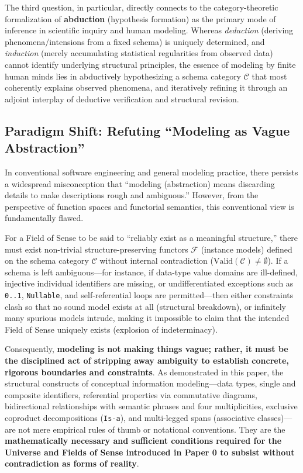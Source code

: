 \documentclass[11pt,a4paper]{article}
\theoremstyle{definition}
\theoremstyle{plain}
\theoremstyle{remark}
\newcommand{\Valid}{\mathrm{Valid}}
\begin{document}
The third question, in particular, directly connects to the category-theoretic formalization of \textbf{abduction} (hypothesis formation) \cite{peirce1903} as the primary mode of inference in scientific inquiry and human modeling. Whereas \emph{deduction} (deriving phenomena/intensions from a fixed schema) is uniquely determined, and \emph{induction} (merely accumulating statistical regularities from observed data) cannot identify underlying structural principles, the essence of modeling by finite human minds lies in abductively hypothesizing a schema category $\mathcal{C}$ that most coherently explains observed phenomena, and iteratively refining it through an adjoint interplay of deductive verification and structural revision.

\subsection{Paradigm Shift: Refuting ``Modeling as Vague Abstraction''}
In conventional software engineering and general modeling practice, there persists a widespread misconception that ``modeling (abstraction) means discarding details to make descriptions rough and ambiguous.'' However, from the perspective of function spaces and functorial semantics, this conventional view is fundamentally flawed.

For a Field of Sense to be said to ``reliably exist as a meaningful structure,'' there must exist non-trivial structure-preserving functors $\mathcal{F}$ (instance models) defined on the schema category $\mathcal{C}$ without internal contradiction ($\Valid(\mathcal{C}) \neq \emptyset$). If a schema is left ambiguous---for instance, if data-type value domains are ill-defined, injective individual identifiers are missing, or undifferentiated exceptions such as \texttt{0..1}, \texttt{Nullable}, and self-referential loops are permitted---then either constraints clash so that no sound model exists at all (structural breakdown), or infinitely many spurious models intrude, making it impossible to claim that the intended Field of Sense uniquely exists (explosion of indeterminacy).

Consequently, \textbf{modeling is not making things vague; rather, it must be the disciplined act of stripping away ambiguity to establish concrete, rigorous boundaries and constraints}. As demonstrated in this paper, the structural constructs of conceptual information modeling---data types, single and composite identifiers, referential properties via commutative diagrams, bidirectional relationships with semantic phrases and four multiplicities, exclusive coproduct decompositions (\texttt{Is-a}), and multi-legged spans (associative classes)---are not mere empirical rules of thumb or notational conventions. They are the \textbf{mathematically necessary and sufficient conditions required for the Universe and Fields of Sense introduced in Paper 0 to subsist without contradiction as forms of reality}.
\end{document}
